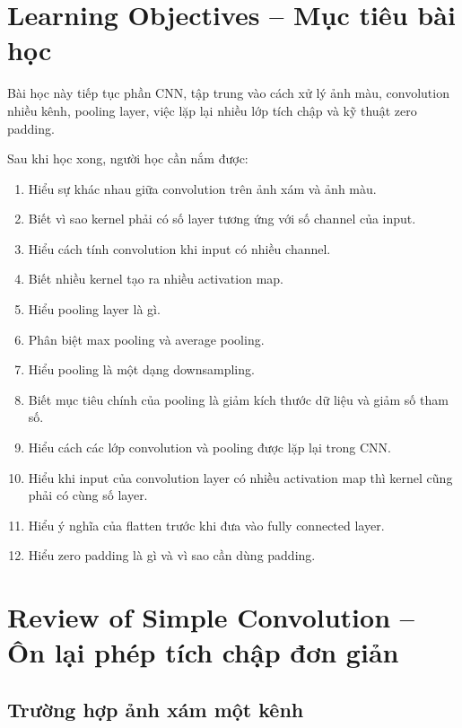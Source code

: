 \section*{Learning Objectives -- Mục tiêu bài học}

Bài học này tiếp tục phần CNN, tập trung vào cách xử lý ảnh màu, convolution nhiều kênh, pooling layer, việc lặp lại nhiều lớp tích chập và kỹ thuật zero padding.

Sau khi học xong, người học cần nắm được:

\begin{enumerate}[label=\arabic*.]
    \item Hiểu sự khác nhau giữa convolution trên ảnh xám và ảnh màu.
    \item Biết vì sao kernel phải có số layer tương ứng với số channel của input.
    \item Hiểu cách tính convolution khi input có nhiều channel.
    \item Biết nhiều kernel tạo ra nhiều activation map.
    \item Hiểu pooling layer là gì.
    \item Phân biệt max pooling và average pooling.
    \item Hiểu pooling là một dạng downsampling.
    \item Biết mục tiêu chính của pooling là giảm kích thước dữ liệu và giảm số tham số.
    \item Hiểu cách các lớp convolution và pooling được lặp lại trong CNN.
    \item Hiểu khi input của convolution layer có nhiều activation map thì kernel cũng phải có cùng số layer.
    \item Hiểu ý nghĩa của flatten trước khi đưa vào fully connected layer.
    \item Hiểu zero padding là gì và vì sao cần dùng padding.
\end{enumerate}

\section{Review of Simple Convolution -- Ôn lại phép tích chập đơn giản}

\subsection{Trường hợp ảnh xám một kênh}

